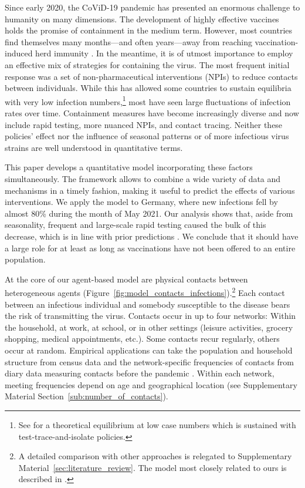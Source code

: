 Since early 2020, the CoViD-19 pandemic has
presented an enormous challenge to humanity on many dimensions. The development of
highly effective vaccines holds the promise of containment in the medium term. However,
most countries find themselves many months---and often years---away from reaching
vaccination-induced herd immunity \citep{Swaminathan2021}. In the meantime, it is of utmost
importance to employ an effective mix of strategies for containing the virus. The most
frequent initial response was a set of non-pharmaceutical interventions (NPIs) to reduce
contacts between individuals. While this has allowed some countries to sustain
equilibria with very low infection numbers,\footnote{See \citet{Contreras2021} for a
theoretical equilibrium at low case numbers which is sustained with
test-trace-and-isolate policies.} most have seen large fluctuations of infection rates
over time. Containment measures have become increasingly diverse and now include rapid
testing, more nuanced NPIs, and contact tracing. Neither these policies' effect nor the
influence of seasonal patterns or of more infectious virus strains are well understood
in quantitative terms.

This paper develops a quantitative model incorporating these factors simultaneously. The
framework allows to combine a wide variety of data and mechanisms in a timely fashion,
making it useful to predict the effects of various interventions. We apply the model to
Germany, where new infections fell by almost 80\% during the month of May 2021. Our
analysis shows that, aside from seasonality, frequent and large-scale rapid testing
caused the bulk of this decrease, which is in line with prior predictions
\citep{Mina2021}. We conclude that it should have a large role for at least as long as
vaccinations have not been offered to an entire population.

At the core of our agent-based model are physical contacts between heterogeneous agents
(Figure~\ref{fig:model_contacts_infections}).\footnote{A detailed comparison with other
approaches  is relegated to Supplementary Material~\ref{sec:literature_review}. The
model most closely related to ours is described in \citet{Hinch2020}.} Each contact
between an infectious individual and somebody susceptible to the disease bears the risk
of transmitting the virus. Contacts occur in up to four networks: Within the household,
at work, at school, or in other settings (leisure activities, grocery shopping, medical
appointments, etc.). Some contacts recur regularly, others occur at random. Empirical
applications can take the population and household structure from census data and the
network-specific frequencies of contacts from diary data measuring contacts before the
pandemic \citep[e.g.][]{Mossong2008,Hoang2019}. Within each network, meeting frequencies
depend on age and geographical location (see Supplementary Material
Section~\ref{sub:number_of_contacts}).

